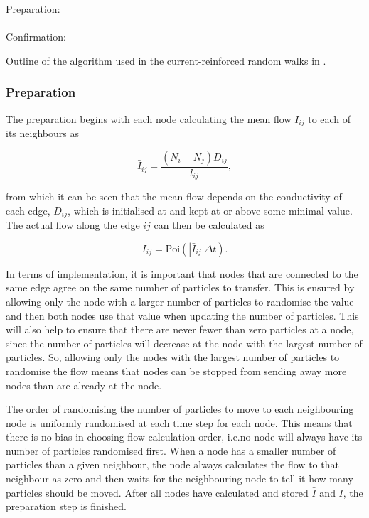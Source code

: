 {
\vspace{1em}
\begin{algorithm}[H]
Preparation:\\
\ \\
Confirmation:\\
\caption{Outline of the algorithm used in the current-reinforced random walks in \cite{Sumpter}.}
\label{alg:outline}
\end{algorithm}
\vspace{1em}
}

\subsubsection{Preparation}
\label{sec:preparation}
The preparation begins with each node calculating the mean flow $\bar{I}_{ij}$ to each of its neighbours as

\begin{equation}
\bar{I}_{ij} = \frac{(N_i - N_j)D_{ij}}{l_{ij}},
\end{equation}

 \noindent from which it can be seen that the mean flow depends on the conductivity of each edge, $D_{ij}$, which is initialised at and kept at or above some minimal value. The actual flow along the edge $ij$ can then be calculated as

\begin{equation}
I_{ij} = \text{Poi}(|\bar{I}_{ij}|\Delta t).
\end{equation}

In terms of implementation, it is important that nodes that are connected to the same edge agree on the same number of particles to transfer. This is ensured by allowing only the node with a larger number of particles to randomise the value and then both nodes use that value when updating the number of particles. This will also help to ensure that there are never fewer than zero particles at a node, since the number of particles will decrease at the node with the largest number of particles. So, allowing only the nodes with the largest number of particles to randomise the flow means that nodes can be stopped from sending away more nodes than are already at the node. 

The order of randomising the number of particles to move to each neighbouring node is uniformly randomised at each time step for each node. This means that there is no bias in choosing flow calculation order, i.e.\@ no node will always have its number of particles randomised first. When a node has a smaller number of particles than a given neighbour, the node always calculates the flow to that neighbour as zero and then waits for the neighbouring node to tell it how many particles should be moved. After all nodes have calculated and stored $\bar{I}$ and $I$, the preparation step is finished.

